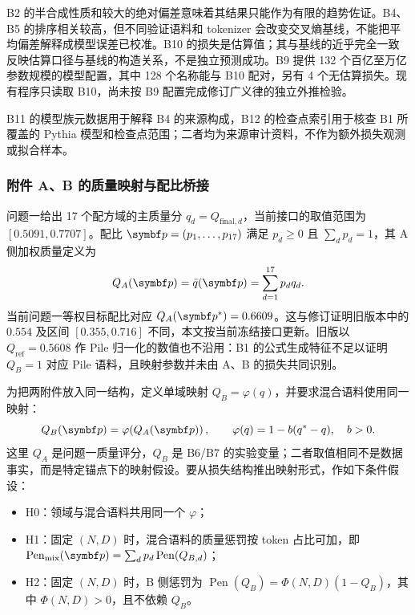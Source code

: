 B2 的半合成性质和较大的绝对偏差意味着其结果只能作为有限的趋势佐证。B4、B5 的排序相关较高，但不同验证语料和 tokenizer 会改变交叉熵基线，不能把平均偏差解释成模型误差已校准。B10 的损失是估算值；其与基线的近乎完全一致反映估算口径与基线的构造关系，不是独立预测成功。B9 提供 132 个百亿至万亿参数规模的模型配置，其中 128 个名称能与 B10 配对，另有 4 个无估算损失。现有程序只读取 B10，尚未按 B9 配置完成修订广义律的独立外推检验。

B11 的模型族元数据用于解释 B4 的来源构成，B12 的检查点索引用于核查 B1 所覆盖的 Pythia 模型和检查点范围；二者均为来源审计资料，不作为额外损失观测或拟合样本。

\subsubsection{附件 A、B 的质量映射与配比桥接}

问题一给出 17 个配方域的主质量分 $q_d=Q_{\mathrm{final},d}$，当前接口的取值范围为 $[0.5091,0.7707]$。配比 $\bp=(p_1,\ldots,p_{17})$ 满足 $p_d\geq0$ 且 $\sum_dp_d=1$，其 A 侧加权质量定义为
\begin{equation}
Q_A(\bp)=\bar q(\bp)=\sum_{d=1}^{17}p_dq_d.
\label{eq:qa_mix}
\end{equation}
当前问题一等权目标配比对应 $Q_A(\bp^*)=0.6609$。这与修订证明旧版本中的 $0.554$ 及区间 $[0.355,0.716]$ 不同，本文按当前冻结接口更新。旧版以 $Q_{\mathrm{ref}}=0.5608$ 作 Pile 归一化的数值也不沿用：B1 的公式生成特征不足以证明 $Q_B=1$ 对应 Pile 语料，且映射参数并未由 A、B 的损失共同识别。

为把两附件放入同一结构，定义单域映射 $Q_B=\varphi(q)$，并要求混合语料使用同一映射：
\begin{equation}
Q_B(\bp)=\varphi\!\left(Q_A(\bp)\right),\qquad
\varphi(q)=1-b(q^*-q),\quad b>0.
\label{eq:qmix}
\end{equation}
这里 $Q_A$ 是问题一质量评分，$Q_B$ 是 B6/B7 的实验变量；二者取值相同不是数据事实，而是特定锚点下的映射假设。要从损失结构推出映射形式，作如下条件假设：
\begin{itemize}
  \item H0：领域与混合语料共用同一个 $\varphi$；
  \item H1：固定 $(N,D)$ 时，混合语料的质量惩罚按 token 占比可加，即 $\operatorname{Pen}_{\mathrm{mix}}(\bp)=\sum_dp_d\operatorname{Pen}(Q_{B,d})$；
  \item H2：固定 $(N,D)$ 时，B 侧惩罚为 $\operatorname{Pen}(Q_B)=\Phi(N,D)(1-Q_B)$，其中 $\Phi(N,D)>0$，且不依赖 $Q_B$。
\end{itemize}

